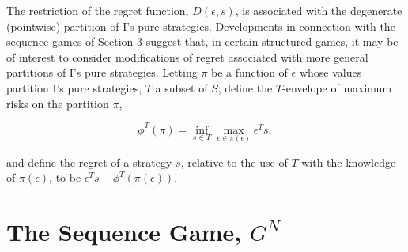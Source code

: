 \documentclass[11pt]{article}
\theoremstyle{boldStyle}
\begin{document}
The restriction of the regret function, \( D(\epsilon, s) \), is associated with the degenerate (pointwise) partition of I's pure strategies. 
Developments in connection with the sequence games of Section 3 suggest that, in certain structured games, 
it may be of interest to consider modifications of regret associated with more general partitions of I's pure strategies. 
Letting \( \pi \) be a function of \( \epsilon \) whose values partition I's pure strategies, 
\( T \) a subset of \( S \), define the \( T \)-envelope of maximum risks on the partition \( \pi \),

\begin{equation}
    \phi^T (\pi) = \inf_{s \in T} \max_{\epsilon \in \pi (\epsilon)} \epsilon^T s,
\end{equation}

and define the regret of a strategy \( s \), relative to the use of \( T \) with the knowledge of \( \pi (\epsilon) \), 
to be \( \epsilon^T s - \phi^T (\pi( \epsilon )) \).













\newpage
\section{The Sequence Game, $G^N$}
\end{document}
